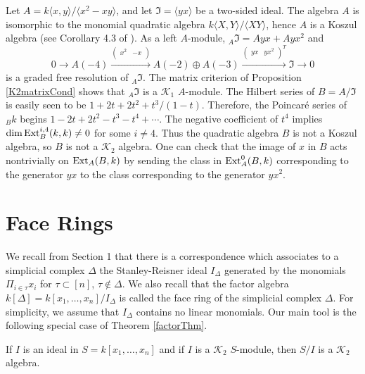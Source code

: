 \documentclass[11pt,righttag]{amsart}
\begin{document}
\begin{example}
Let $A=k{\langle} x,y{\rangle}/{\langle} x^2-xy{\rangle}$, and let ${\mathfrak{I}}=\langle yx\rangle$ be a two-sided ideal. The algebra $A$ is isomorphic to the monomial quadratic algebra $k{\langle} X, Y{\rangle}/{\langle} XY{\rangle}$, hence $A$ is a Koszul algebra (see Corollary 4.3 of \cite{PP}). As a left $A$-module, $_A{\mathfrak{I}}=Ayx+Ayx^2$ and
$$0\rightarrow A(-4)\xrightarrow{\begin{pmatrix} x^2 & -x\\ \end{pmatrix}} A(-2)\oplus A(-3)\xrightarrow{\begin{pmatrix} yx & yx^2\\ \end{pmatrix}^T} 
{\mathfrak{I}}\rightarrow 0$$
is a graded free resolution of $_A{\mathfrak{I}}$. 
The matrix criterion of Proposition \ref{K2matrixCond} shows that $_A{\mathfrak{I}}$ is a ${{\mathcal K}}_1$ $A$-module. The Hilbert series of $B=A/{\mathfrak{I}}$ is easily seen to be $1+2t+2t^2+t^3/(1-t)$. Therefore, the Poincar\'{e} series of $_Bk$ begins $1-2t+2t^2-t^3-t^4+\cdots$. The negative coefficient of $t^4$ implies $\dim {\hbox{{\rm Ext}}}_B^{i,4}(k,k)\neq 0$ for some $i\neq 4$. Thus the quadratic algebra $B$ is not a Koszul algebra, so $B$ is not a ${{\mathcal K}}_2$ algebra.
One can check that the image of $x$ in $B$ acts nontrivially on ${\hbox{{\rm Ext}}}_A(B,k)$ by sending the class in ${\hbox{{\rm Ext}}}_A^0(B,k)$ corresponding to the generator $yx$ to the class corresponding to the generator $yx^2$.
\end{example}

\section{Face Rings}
\label{faceRings}

We recall from Section 1 that there is a correspondence which associates to a simplicial complex ${\Delta}$ the Stanley-Reisner ideal $I_{\Delta}$ generated by the monomials $\Pi_{i\in \tau} x_i$ for $\tau\subset [n]$, $\tau\notin{\Delta}$. We also recall that the factor algebra $k[{\Delta}]=k[x_1,\ldots,x_n]/I_{\Delta}$ is called the face ring of the simplicial complex ${\Delta}$. For simplicity, we assume that $I_{\Delta}$ contains no linear monomials.
Our main tool is the following special case of Theorem \ref{factorThm}.

\begin{thm}
\label{K2FaceRings}
If $I$ is an ideal in $S=k[x_1,\ldots,x_n]$ and if $I$ is a ${{\mathcal K}}_2$ $S$-module, then $S/I$ is a ${{\mathcal K}}_2$ algebra.
\end{thm}
\end{document}

